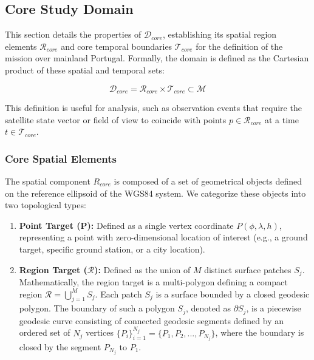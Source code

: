 \subsection{Core Study Domain}



This section details the properties of $\mathcal{D}_{core}$, establishing its spatial region elements $\mathcal{R}_{core}$ and core temporal boundaries $\mathcal{T}_{core}$ for the definition of the mission over mainland Portugal. Formally, the domain is defined as the Cartesian product of these spatial and temporal sets:

\begin{equation}

    \mathcal{D}_{core} = \mathcal{R}_{core} \times \mathcal{T}_{core} \subset \mathcal{M}

\end{equation}

This definition is useful for analysis, such as observation events that require the satellite state vector or field of view to coincide with points $p \in \mathcal{R}_{core}$ at a time $t \in \mathcal{T}_{core}$. 



\subsubsection{Core Spatial Elements}



The spatial component $R_{core}$ is composed of a set of geometrical objects defined on the reference ellipsoid of the WGS84 system. We categorize these objects into two topological types:



\begin{enumerate}

    \item \textbf{Point Target (P):} Defined as a single vertex coordinate $P(\phi, \lambda, h)$, representing a point with zero-dimensional location of interest (e.g., a ground target, specific ground station, or a city location).



    \item \textbf{Region Target ($\mathcal{R}$):} Defined as the union of $M$ distinct surface patches $S_j$. Mathematically, the region target is a multi-polygon defining a compact region $\mathcal{R} = \bigcup_{j=1}^{M} S_j$. Each patch $S_j$ is a surface bounded by a closed geodesic polygon. The boundary of such a polygon $S_j$, denoted as $\partial S_j$, is a piecewise geodesic curve consisting of connected geodesic segments defined by an ordered set of $N_j$ vertices $\{P_{i}\}_{i=1}^{N_j} = \{P_{1}, P_{2}, ..., P_{N_{j}}\}$, where the boundary is closed by the segment $P_{N_{j}}$ to $P_{1}$.

\end{enumerate}



